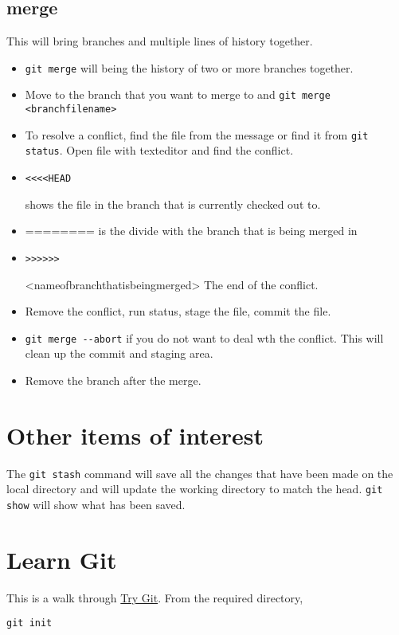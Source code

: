 \documentclass[11pt]{article} %
\begin{document}
\subsection{merge}
This will bring branches and multiple lines of history together. 
\begin{itemize}
\item \lstinline{git merge} will being the history of two or more branches together. 
\item Move to the branch that you want to merge to and \lstinline{git merge <branchfilename>} 
\item To resolve a conflict, find the file from the message or find it from \lstinline{git status}. Open file with texteditor and find the conflict. 
\item \begin{verbatim}<<<<HEAD\end{verbatim} shows the file in the branch that is currently checked out to.
\item ======== is the divide with the branch that is being merged in
\item \begin{verbatim}>>>>>>\end{verbatim} <nameofbranchthatisbeingmerged>  The end of the conflict. 
\item Remove the conflict, run status, stage the file, commit the file.
\item \lstinline{git merge --abort} if you do not want to deal wth the conflict. This will clean up the commit and staging area. 
\item Remove the branch after the merge. 
\end{itemize}



\section{Other items of interest}
The \lstinline{git stash} command will save all the changes that have been made on the local directory and will update the working directory to match the head.
\lstinline{git show} will show what has been saved. 
\section{Learn Git}
This  is a walk through \href{http://try.github.io}{Try Git}.  
From the required directory, 
\begin{lstlisting}
git init
\end{lstlisting}
\end{document}
